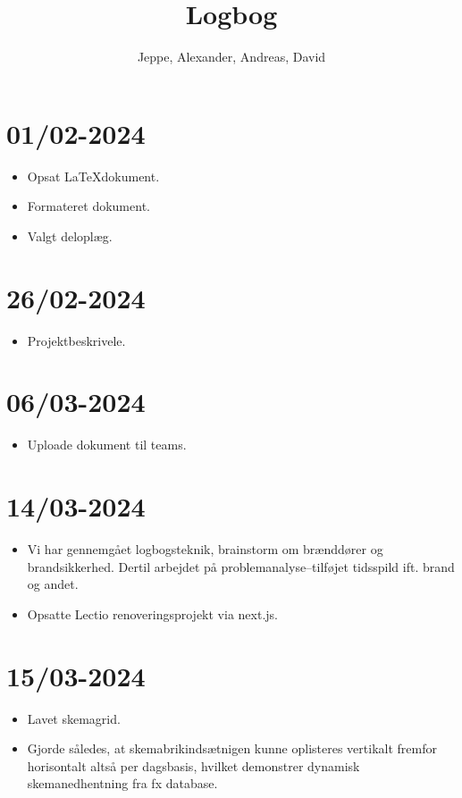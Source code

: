 \documentclass[12pt, a4paper]{article}
\title{Logbog}
\author{Jeppe, Alexander, Andreas, David}
\date{}
\begin{document}
    \maketitle
    \tableofcontents
    \newpage

    \section{01/02-2024}
        \begin{itemize}
            \item Opsat \LaTeX dokument.
            \item Formateret dokument.
            \item Valgt deloplæg.
        \end{itemize}

    \section{26/02-2024}
        \begin{itemize}
            \item Projektbeskrivele.
        \end{itemize}

    \section{06/03-2024}
        \begin{itemize}
            \item Uploade dokument til teams. 
        \end{itemize}

    \section{14/03-2024}
        \begin{itemize}
            \item Vi har gennemgået logbogsteknik, brainstorm om brænddører og brandsikkerhed. Dertil arbejdet på problemanalyse--tilføjet tidsspild ift. brand og andet.
            \item Opsatte Lectio renoveringsprojekt via next.js.
        \end{itemize}

    \section{15/03-2024}
        \begin{itemize}
            \item Lavet skemagrid.
            \item Gjorde således, at skemabrikindsætnigen kunne oplisteres vertikalt fremfor horisontalt altså per dagsbasis, hvilket demonstrer dynamisk skemanedhentning fra fx database.
        \end{itemize}
\end{document}
